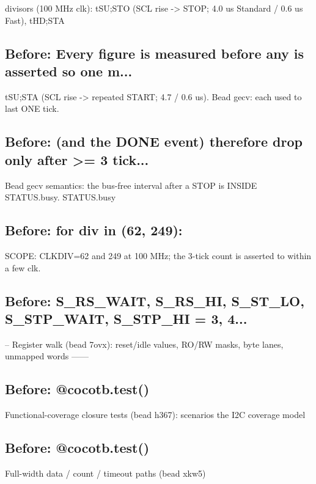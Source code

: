 \begin{record}
\begin{textblock}
divisors (100 MHz clk): tSU;STO (SCL rise -> STOP; 4.0 us Standard / 0.6 us Fast), tHD;STA
\end{textblock}

\subsection*{Before: Every figure is measured before any is asserted so one m...}

\begin{textblock}
tSU;STA (SCL rise -> repeated START; 4.7 / 0.6 us).  Bead gecv: each used to last ONE tick.
\end{textblock}

\subsection*{Before: (and the DONE event) therefore drop only after >= 3 tick...}

\begin{textblock}
Bead gecv semantics: the bus-free interval after a STOP is INSIDE STATUS.busy.  STATUS.busy
\end{textblock}

\subsection*{Before: for div in (62, 249):}

\begin{textblock}
SCOPE: CLKDIV=62 and 249 at 100 MHz; the 3-tick count is asserted to within a few clk.
\end{textblock}

\subsection*{Before: S\_RS\_WAIT, S\_RS\_HI, S\_ST\_LO, S\_STP\_WAIT, S\_STP\_HI = 3, 4...}

\begin{textblock}
-- Register walk (bead 7ovx): reset/idle values, RO/RW masks, byte lanes, unmapped words ------
\end{textblock}

\subsection*{Before: @cocotb.test()}

\begin{textblock}
Functional-coverage closure tests (bead h367): scenarios the I2C coverage model
\end{textblock}

\subsection*{Before: @cocotb.test()}

\begin{textblock}
Full-width data / count / timeout paths (bead xkw5)
\end{textblock}

\end{record}

